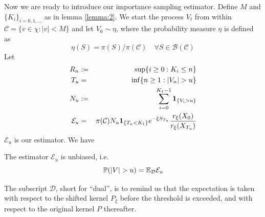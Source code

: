 Now we are ready to introduce our importance sampling estimator.
Define $M$ and $\{K_i\}_ {i=0,1,\dots}$ as in lemma \ref{lemma:2}.
We start the process $V_t$ from within
$\mathcal C = \{v \in \chi: |v| < M\}$
and let $V_0 \sim \eta$, where the probability
measure $\eta$ is defined as
\[
\eta(S) = \pi(S) / \pi(\mathcal C)
\quad \forall S \in \mathcal B(\mathcal C)
\]
Let
\begin{eqnarray*}
  R_n &:=& \sup\{i \geq 0: K_i \leq n\} \\
  T_u &=& \inf\{n \geq 1: |V_n| > u\} \\
  N_u &:=& \sum_{i=0}^{K_1 - 1} \mathbf{1}_{\{V_i > u\}} \\
  \mathcal E_u &=& \pi(\mathcal C)
  N_u \mathbf{1}_{\{T_u < K_1\}} e^{-\xi S_{T_u}}
  {r_\xi(X_0) \over r_\xi(X_{T_u})}
\end{eqnarray*}
$\mathcal E_u$ is our estimator. We have
\begin{theorem}
  \label{thrm:consistency}
  The estimator $\mathcal E_u$ is unbiased, i.e.
  \begin{equation}
    \label{eq:fbf}
    \mathbb{P}(|V| > u) = \mathbb{E}_{\mathcal D} \mathcal E_u
  \end{equation}
\end{theorem}
The subscript $\mathcal D$, short for ``dual'', is to remind us
that the expectation is taken with respect to the shifted kernel
$P_\xi$ before the threshold is exceeded, and with respect to the
original kernel $P$ thereafter.


